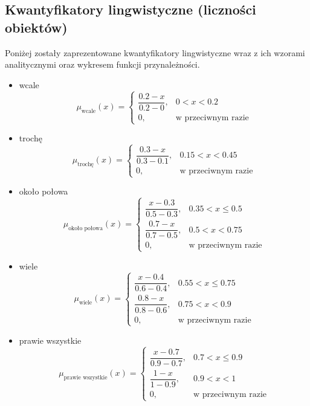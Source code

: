 \documentclass{article}
\begin{document}
\subsection{Kwantyfikatory lingwistyczne (liczności obiektów)}
Poniżej zostały zaprezentowane kwantyfikatory lingwistyczne wraz z ich wzorami analitycznymi oraz wykresem funkcji przynależności.
\begin{itemize}
    \item wcale
        \begin{equation}
            \mu_{\text{wcale}}(x) =
        \begin{cases}
        \dfrac{0.2 - x}{0.2 - 0}, & 0 < x < 0.2 \\
        0, & \text{w przeciwnym razie}
        \end{cases}
        \end{equation}
    \item trochę
        \begin{equation}
            \mu_{\text{trochę}}(x) =
\begin{cases}
\dfrac{0.3 - x}{0.3 - 0.1}, & 0.15 < x < 0.45 \\
0, & \text{w przeciwnym razie}
\end{cases}
        \end{equation}
    \item około połowa
        \begin{equation}
\mu_{\text{około połowa}}(x) =
\begin{cases}
\dfrac{x - 0.3}{0.5 - 0.3}, & 0.35 < x \leq 0.5 \\
\dfrac{0.7 - x}{0.7 - 0.5}, & 0.5 < x < 0.75 \\
0, & \text{w przeciwnym razie}
\end{cases}
        \end{equation}
    \item{wiele}
        \begin{equation}
            \mu_{\text{wiele}}(x) =
\begin{cases}
\dfrac{x - 0.4}{0.6 - 0.4}, & 0.55 < x \leq 0.75 \\
\dfrac{0.8 - x}{0.8 - 0.6}, & 0.75 < x < 0.9 \\
0, & \text{w przeciwnym razie}
\end{cases}
        \end{equation}
    \item{prawie wszystkie}
        \begin{equation}
            \mu_{\text{prawie wszystkie}}(x) =
\begin{cases}
\dfrac{x - 0.7}{0.9 - 0.7}, & 0.7 < x \leq 0.9 \\
\dfrac{1 - x}{1 - 0.9}, & 0.9 < x < 1 \\
0, & \text{w przeciwnym razie}
\end{cases}
        \end{equation}
\end{itemize}
\end{document}
